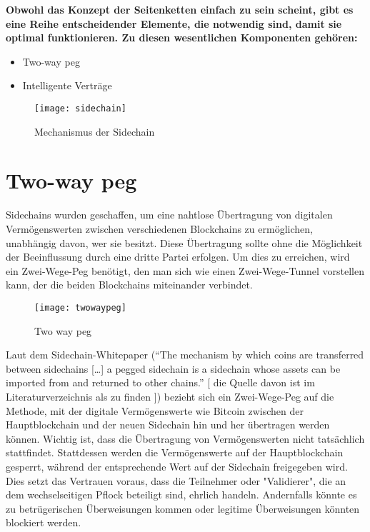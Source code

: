 \textbf{Obwohl das Konzept der Seitenketten einfach zu sein scheint, gibt es eine Reihe entscheidender Elemente, die notwendig sind, damit sie optimal funktionieren. Zu diesen wesentlichen Komponenten gehören:}

\begin{itemize}
	\item Two-way peg
	\item Intelligente Verträge
\end{itemize}


\begin{figure}[H]
	\texttt{[image: sidechain]}
	\caption{Mechanismus der Sidechain}
	\small{ \cite{third_image} }
\end{figure}

\section{Two-way peg}
Sidechains wurden geschaffen, um eine nahtlose Übertragung von digitalen Vermögenswerten zwischen verschiedenen Blockchains zu ermöglichen, unabhängig davon, wer sie besitzt. Diese Übertragung sollte ohne die Möglichkeit der Beeinflussung durch eine dritte Partei erfolgen. Um dies zu erreichen, wird ein Zwei-Wege-Peg benötigt, den man sich wie einen Zwei-Wege-Tunnel vorstellen kann, der die beiden Blockchains miteinander verbindet. \\

\begin{figure}[H]
	\texttt{[image: twowaypeg]}
	\caption{Two way peg}
	\small{\cite{six_image}}
\end{figure}

Laut dem Sidechain-Whitepaper (“The mechanism by which coins are transferred between sidechains […] a pegged sidechain is a sidechain whose assets can be imported from and returned to other chains.” [ die Quelle davon ist im Literaturverzeichnis als \cite{blockstream2014enabling} zu finden ]) bezieht sich ein Zwei-Wege-Peg auf die Methode, mit der digitale Vermögenswerte wie Bitcoin zwischen der Hauptblockchain und der neuen Sidechain hin und her übertragen werden können. Wichtig ist, dass die Übertragung von Vermögenswerten nicht tatsächlich stattfindet. Stattdessen werden die Vermögenswerte auf der Hauptblockchain gesperrt, während der entsprechende Wert auf der Sidechain freigegeben wird. \\ 
Dies setzt das Vertrauen voraus, dass die Teilnehmer oder "Validierer", die an dem wechselseitigen Pflock beteiligt sind, ehrlich handeln. Andernfalls könnte es zu betrügerischen Überweisungen kommen oder legitime Überweisungen könnten blockiert werden.
